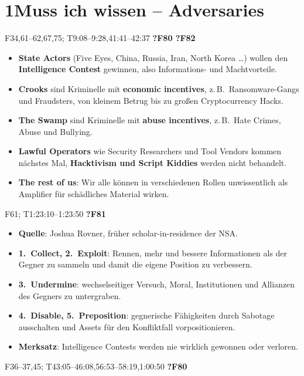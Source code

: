 \documentclass[10pt,a4paper]{article}
\newcommand{\block}[2]{\par\vspace{3pt}{\bfseries #1}\hfill{\scriptsize #2}\par\nopagebreak}
\begin{document}
\section*{1\quad Muss ich wissen -- Adversaries}
\block{Wer sind die Gegner und was treibt sie an?}{F34,61--62,67,75; T9:08--9:28,41:41--42:37 \quad \textbf{?F80 ?F82}}
\begin{itemize}
\item \textbf{State Actors} (Five Eyes, China, Russia, Iran, North Korea \dots) wollen den \textbf{Intelligence Contest} gewinnen, also Informations- und Machtvorteile.
\item \textbf{Crooks} sind Kriminelle mit \textbf{economic incentives}, z.\,B.\ Ransomware-Gangs und Fraudsters, von kleinem Betrug bis zu großen Cryptocurrency Hacks.
\item \textbf{The Swamp} sind Kriminelle mit \textbf{abuse incentives}, z.\,B.\ Hate Crimes, Abuse und Bullying.
\item \textbf{Lawful Operators} wie Security Researchers und Tool Vendors kommen nächstes Mal, \textbf{Hacktivism und Script Kiddies} werden nicht behandelt.
\item \textbf{\glqq The rest of us\grqq}: Wir alle können in verschiedenen Rollen unwissentlich als Amplifier für schädliches Material wirken.
\end{itemize}
\block{Intelligence Contests (Intelligence Doctrine)}{F61; T1:23:10--1:23:50 \quad \textbf{?F81}}
\begin{itemize}
\item \textbf{Quelle}: Joshua Rovner, früher scholar-in-residence der NSA.
\item \textbf{1.\ Collect, 2.\ Exploit}: Rennen, mehr und bessere Informationen als der Gegner zu sammeln und damit die eigene Position zu verbessern.
\item \textbf{3.\ Undermine}: wechselseitiger Versuch, Moral, Institutionen und Allianzen des Gegners zu untergraben.
\item \textbf{4.\ Disable, 5.\ Preposition}: gegnerische Fähigkeiten durch Sabotage ausschalten und Assets für den Konfliktfall vorpositionieren.
\item \textbf{Merksatz}: Intelligence Contests werden nie wirklich gewonnen oder verloren.
\end{itemize}
\block{Five Eyes (FVEY): wer und wie?}{F36--37,45; T43:05--46:08,56:53--58:19,1:00:50 \quad \textbf{?F80}}
\end{document}
